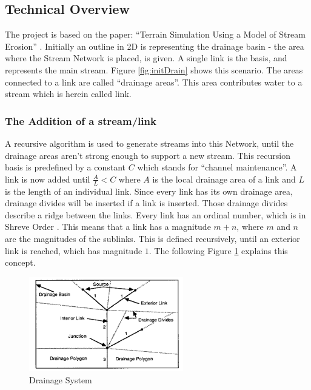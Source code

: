 \documentclass[11pt,a4paper]{article}
\begin{document}
\subsection{Technical Overview}
The project is based on the paper: ``Terrain Simulation Using a Model of
Stream Erosion''\cite{kelley1988terrain} .
Initially an outline in 2D is representing the drainage basin - the area where
the Stream Network is placed, is given.
A single link is the basis, and represents the main stream. Figure
\ref{fig:initDrain} shows this scenario.
The areas connected to a link are called ``drainage areas''. This area
contributes water to a stream which is herein called link.
\subsubsection{The Addition of a stream/link}
A recursive algorithm is used to generate streams into this Network, until the
drainage areas aren't strong enough to support a new stream. This recursion
basis is predefined by a constant $C$ which stands for ``channel maintenance''.
A link is now added until $\frac{A}{L} < C$ where $A$ is the local drainage
area of a link and $L$ is the length of an individual link.
Since every link has its own drainage area, drainage divides will be
inserted if a link is inserted. Those drainage divides describe a ridge between
the links. Every link has an ordinal number, which is in Shreve Order
\cite{shreve1966statistical}.
This means that a link has a magnitude $m + n$, where $m$ and $n$ are the
magnitudes of the sublinks.
This is defined recursively, until an exterior link is
reached, which has magnitude $1$.
The following Figure \ref{fig:explDrain} explains this concept.
\begin{figure}[h!]
  \centering
	\includegraphics[width=0.6\textwidth]{images/DrainageExplanation}
	\caption{Drainage System \cite{kelley1988terrain}} 
	\label{fig:explDrain}
\end{figure}
\end{document}
